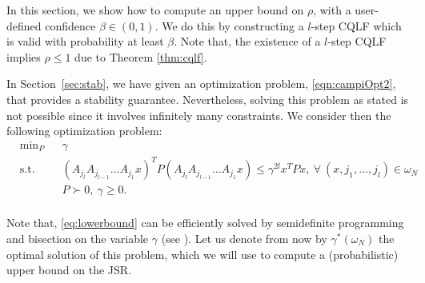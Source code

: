 In this section, we show how to compute an upper bound on $\rho$, with a user-defined confidence $\beta \in (0, 1)$. We do this by constructing a $l$-step CQLF which is valid with probability at least $\beta$. Note that, the existence of a $l$-step CQLF implies $\rho \leq 1$ due to Theorem \ref{thm:cqlf}.

In Section~\ref{sec:stab}, we have given an optimization problem, \eqref{eqn:campiOpt2}, that provides a stability guarantee. Nevertheless, solving this problem as stated is not possible since it involves infinitely many constraints. We consider then the following optimization problem:
\begin{equation}\label{eq:lowerbound}
\begin{aligned}
& \text{min}_P & & \gamma \\
& \text{s.t.} 
&  & (A_{j_l} A_{j_{l-1}} \dots A_{j_1} x)^T P (A_{j_l} A_{j_{l-1}} \dots A_{j_1} x) \leq \gamma^{2l} x^T P x, \  \forall\ (x, j_1,\dots, j_l) \in \omega_N\\
& && P \succ 0,\ \gamma \geq 0. \\
\end{aligned}
\end{equation}

Note that, \eqref{eq:lowerbound} can be efficiently solved by semidefinite programming and bisection on the variable $\gamma$ (see \cite{boyd}). Let us denote from now by $\gamma^*(\omega_N)$ the optimal solution of this problem, which we will use to compute a (probabilistic) upper bound on the JSR.







